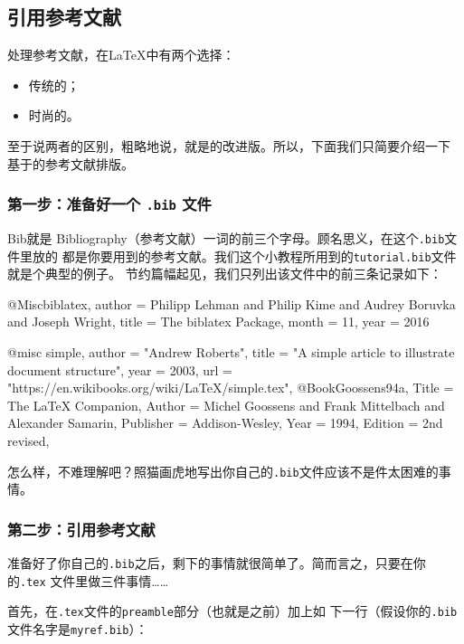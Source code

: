 \subsection{引用参考文献}
\label{sec:ref}

处理参考文献，在\LaTeX{}中有两个选择：
\begin{itemize}
\item 传统的\bibtex{}；
\item 时尚的\biblatex{}。
\end{itemize}
至于说两者的区别，粗略地说，\biblatex{}就是\bibtex{}的改进版。所以，下面我们只简要介绍一下
基于\biblatex{}的参考文献排版。

\subsubsection{第一步：准备好一个 \texttt{.bib} 文件}
Bib就是 Bibliography（参考文献）一词的前三个字母。顾名思义，在这个\texttt{.bib}文件里放的
都是你要用到的参考文献。我们这个小教程所用到的\texttt{tutorial.bib}文件就是个典型的例子。
节约篇幅起见，我们只列出该文件中的前三条记录如下：

\begin{longlisting}
\begin{bibtexcode}
@Misc{biblatex,
  author = {Philipp Lehman and Philip Kime and Audrey Boruvka and Joseph Wright},
  title = {The biblatex Package},
  month = 11,
  year = 2016}

@misc{ simple,
  author = "Andrew Roberts",
  title = "A simple article to illustrate document structure",
  year = 2003,
  url = "https://en.wikibooks.org/wiki/LaTeX/simple.tex",
}
@Book{Goossens94a,
  Title = {The LaTeX Companion},
  Author = {Michel Goossens and Frank Mittelbach and Alexander Samarin},
  Publisher = {Addison-Wesley},
  Year = 1994,
  Edition = {2nd revised},
}
\end{bibtexcode}
\end{longlisting}

怎么样，不难理解吧？照猫画虎地写出你自己的\texttt{.bib}文件应该不是件太困难的事情。

\subsubsection{第二步：引用参考文献}

准备好了你自己的\texttt{.bib}之后，剩下的事情就很简单了。简而言之，只要在你的\texttt{.tex}
文件里做三件事情……

首先，在\texttt{.tex}文件的\texttt{preamble}部分（也就是\ltx{}之前）加上如
  下一行（假设你的\texttt{.bib}文件名字是\texttt{myref.bib}）：
\begin{codeblock}
  \begin{latexcode}
    
  \end{latexcode}
\end{codeblock}

